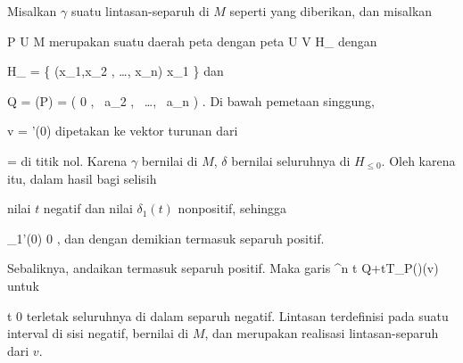 Misalkan $\gamma$ suatu lintasan-separuh di $M$ seperti yang diberikan, dan misalkan

\mavergleichskette
{\vergleichskette
{ P
}
{ \in }{  U
}
{ \subseteq }{ M
}
{    }{
}
{   }{
}
}
{}{}{}
merupakan suatu daerah peta dengan peta
\maabbdisp {\alpha} { U } {V \subseteq  H_{}
} {}
dengan

\mavergleichskettedisp
{\vergleichskette
{  H_{}
}
{ =} { \left\{ (x_1,x_2 , \ldots, x_n)  \mid   x_1         \right\}
}
{ } {
}
{ } {
}
{ } {
}
}
{}{}{}
dan

\mavergleichskettedisp
{\vergleichskette
{ Q
}
{ =} { \alpha(P)
}
{ =} { \left(  0   , \,  a_2  , \,   \ldots , \,  a_n                \right)
}
{ } {
}
{ } {
}
}
{}{}{.}
Di bawah pemetaan singgung,

\mavergleichskette
{\vergleichskette
{ v
}
{ = }{ \gamma'(0)
}
{  }{
}
{    }{
}
{   }{
}
}
{}{}{}
dipetakan ke vektor turunan dari

\mavergleichskette
{\vergleichskette
{ \delta
}
{ = }{ \alpha \circ \gamma
}
{  }{
}
{    }{
}
{   }{
}
}
{}{}{}
di titik nol. Karena $\gamma$ bernilai di $M$, $\delta$ bernilai seluruhnya di $H_{\leq 0}$. Oleh karena itu, dalam hasil bagi selisih

 {  }

nilai $t$ negatif dan nilai $\delta_1(t)$ nonpositif, sehingga

\mavergleichskettedisp
{\vergleichskette
{  \delta_1'(0)
}
{ \geq} { 0
}
{ } {
}
{ } {
}
{ } {
}
}
{}{}{,}
dan dengan demikian termasuk separuh positif.

Sebaliknya, andaikan
 termasuk separuh positif. Maka garis
\maabbeledisp {\delta} {\R} {\R^n
} { t } { Q+tT_P(\alpha)(v)
} {}
untuk

\mavergleichskette
{\vergleichskette
{ t
}
{ \leq }{  0
}
{  }{
}
{    }{
}
{   }{
}
}
{}{}{}
terletak seluruhnya di dalam separuh negatif. Lintasan
 terdefinisi pada suatu interval di sisi negatif, bernilai di $M$, dan merupakan realisasi lintasan-separuh dari $v$.

